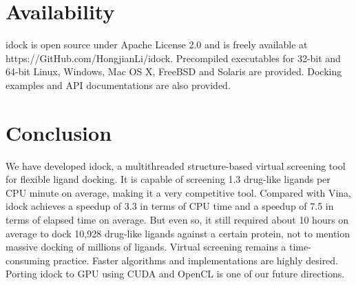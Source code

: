 \documentclass[10pt,conference,compsocconf]{../IEEEtran}
\begin{document}
\section{Availability}

idock is open source under Apache License 2.0 and is freely available at https://GitHub.com/HongjianLi/idock. Precompiled executables for 32-bit and 64-bit Linux, Windows, Mac OS X, FreeBSD and Solaris are provided. Docking examples and API documentations are also provided.

\section{Conclusion}

We have developed idock, a multithreaded structure-based virtual screening tool for flexible ligand docking. It is capable of screening 1.3 drug-like ligands per CPU minute on average, making it a very competitive tool. Compared with Vina, idock achieves a speedup of 3.3 in terms of CPU time and a speedup of 7.5 in terms of elapsed time on average. But even so, it still required about 10 hours on average to dock 10,928 drug-like ligands against a certain protein, not to mention massive docking of millions of ligands. Virtual screening remains a time-consuming practice. Faster algorithms and implementations are highly desired. Porting idock to GPU using CUDA and OpenCL is one of our future directions.



\end{document}
